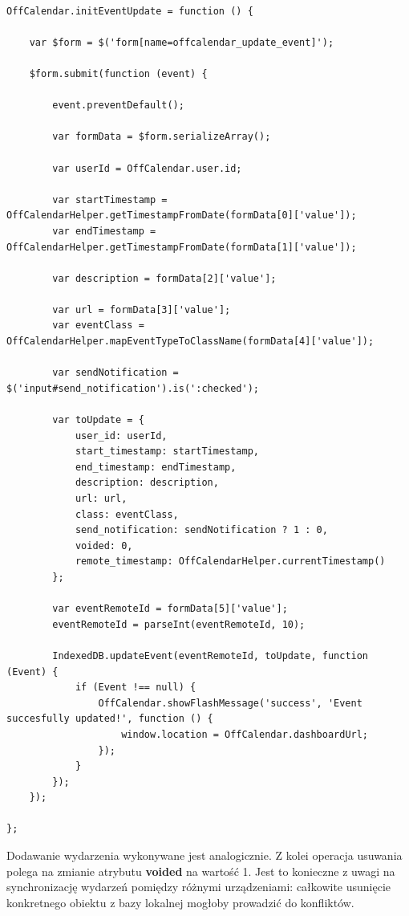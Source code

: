 \begin{lstlisting}[caption=Edycja wydarzenia cz. 2., label=amb, captionpos=b]

OffCalendar.initEventUpdate = function () {

    var $form = $('form[name=offcalendar_update_event]');

    $form.submit(function (event) {

        event.preventDefault();

        var formData = $form.serializeArray();

        var userId = OffCalendar.user.id;

        var startTimestamp = OffCalendarHelper.getTimestampFromDate(formData[0]['value']);
        var endTimestamp = OffCalendarHelper.getTimestampFromDate(formData[1]['value']);

        var description = formData[2]['value'];

        var url = formData[3]['value'];
        var eventClass = OffCalendarHelper.mapEventTypeToClassName(formData[4]['value']);

        var sendNotification = $('input#send_notification').is(':checked');

        var toUpdate = {
            user_id: userId,
            start_timestamp: startTimestamp,
            end_timestamp: endTimestamp,
            description: description,
            url: url,
            class: eventClass,
            send_notification: sendNotification ? 1 : 0,
            voided: 0,
            remote_timestamp: OffCalendarHelper.currentTimestamp()
        };

        var eventRemoteId = formData[5]['value'];
        eventRemoteId = parseInt(eventRemoteId, 10);

        IndexedDB.updateEvent(eventRemoteId, toUpdate, function (Event) {
            if (Event !== null) {
                OffCalendar.showFlashMessage('success', 'Event succesfully updated!', function () {
                    window.location = OffCalendar.dashboardUrl;
                });
            }
        });
    });

};

\end{lstlisting}

Dodawanie wydarzenia wykonywane jest analogicznie. Z kolei operacja usuwania polega na zmianie atrybutu \textbf{voided} na wartość 1. Jest to konieczne z uwagi na synchronizację wydarzeń pomiędzy różnymi urządzeniami: całkowite usunięcie konkretnego obiektu z bazy lokalnej mogłoby prowadzić do konfliktów.

